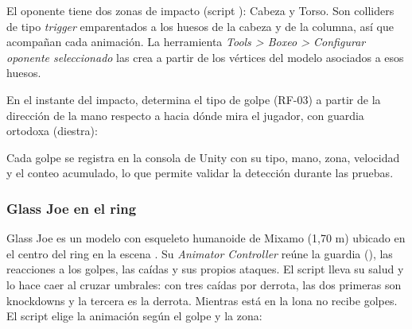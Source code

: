 El oponente tiene dos zonas de impacto (script ): Cabeza y Torso. Son colliders de tipo \emph{trigger} emparentados a los huesos de la cabeza y de la columna, así que acompañan cada animación. La herramienta \emph{Tools > Boxeo > Configurar oponente seleccionado} las crea a partir de los vértices del modelo asociados a esos huesos.

En el instante del impacto,  determina el tipo de golpe (RF-03) a partir de la dirección de la mano respecto a hacia dónde mira el jugador, con guardia ortodoxa (diestra):

\begin{table}[H]
\centering
\caption{Clasificación de los golpes del jugador.}
\end{table}

Cada golpe se registra en la consola de Unity con su tipo, mano, zona, velocidad y el conteo acumulado, lo que permite validar la detección durante las pruebas.

\subsubsection*{Glass Joe en el ring}
Glass Joe es un modelo con esqueleto humanoide de Mixamo (1,70 m) ubicado en el centro del ring en la escena . Su \emph{Animator Controller} reúne la guardia (), las reacciones a los golpes, las caídas y sus propios ataques. El script  lleva su salud y lo hace caer al cruzar umbrales: con tres caídas por derrota, las dos primeras son knockdowns y la tercera es la derrota. Mientras está en la lona no recibe golpes. El script  elige la animación según el golpe y la zona:

\begin{table}[H]
\centering
\caption{Reacciones animadas de Glass Joe.}
\end{table}


